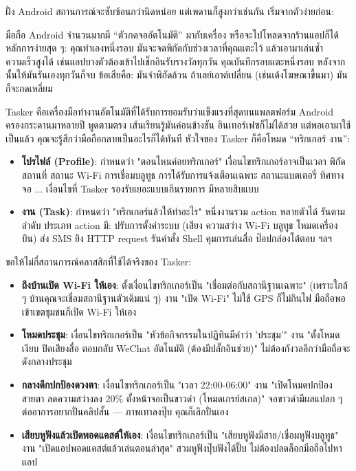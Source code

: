 
ฝั่ง Android สถานการณ์จะซับซ้อนกว่านิดหน่อย แต่เพดานก็สูงกว่าเช่นกัน เริ่มจากตัวง่ายก่อน:


มือถือ Android จำนวนมากมี “ตัวกดจออัตโนมัติ” มากับเครื่อง หรือจะไปโหลดจากร้านแอปก็ได้ หลักการง่ายสุด ๆ: คุณทำเองหนึ่งรอบ มันจะจดพิกัดกับช่วงเวลาที่คุณแตะไว้ แล้วเอามาเล่นซ้ำความเร็วสูงได้ เช่นแอปบางตัวต้องเข้าไปเช็กอินรับรางวัลทุกวัน คุณบันทึกรอบแตะหนึ่งรอบ หลังจากนั้นให้มันรันเองทุกวันก็จบ ข้อเสียคือ: มันจำพิกัดล้วน ถ้าเลย์เอาต์เปลี่ยน (เช่นเด้งโฆษณาขึ้นมา) มันก็จะกดเหลี่ยม


Tasker คือเครื่องมือทำงานอัตโนมัติที่ได้รับการยอมรับว่าแข็งแรงที่สุดบนแพลตฟอร์ม Android ครองกระดานมาหลายปี พูดตามตรง เส้นเรียนรู้มันค่อนข้างชัน อินเทอร์เฟซก็ไม่ได้สวย แต่พอเอามาใช้เป็นแล้ว คุณจะรู้สึกว่ามือถือกลายเป็นอะไรก็ได้ทันที หัวใจของ Tasker ก็คือโหมด “ทริกเกอร์ งาน”:

\begin{itemize}
  \item \textbf{โปรไฟล์ (Profile)}: กำหนดว่า "ตอนไหนค่อยทริกเกอร์" เงื่อนไขทริกเกอร์อาจเป็นเวลา พิกัดสถานที่ สถานะ Wi-Fi การเชื่อมบลูทูธ การได้รับการแจ้งเตือนเฉพาะ สถานะแบตเตอรี่ ทิศทางจอ ... เงื่อนไขที่ Tasker รองรับเยอะแบบเกินรายการ มีหลายสิบแบบ
  \item \textbf{งาน (Task)}: กำหนดว่า "ทริกเกอร์แล้วให้ทำอะไร" หนึ่งงานรวม action หลายตัวได้ รันตามลำดับ ประเภท action มี: ปรับการตั้งค่าระบบ (เสียง ความสว่าง Wi-Fi บลูทูธ โหมดเครื่องบิน) ส่ง SMS ยิง HTTP request รันคำสั่ง Shell คุมการเล่นสื่อ ป๊อปกล่องโต้ตอบ ฯลฯ
\end{itemize}

ขอให้ไม่กี่สถานการณ์คลาสสิกที่ใช้ได้จริงของ Tasker:

\begin{itemize}
  \item \textbf{ถึงบ้านเปิด Wi-Fi ให้เอง}: ตั้งเงื่อนไขทริกเกอร์เป็น "เชื่อมต่อกับสถานีฐานเฉพาะ" (เพราะใกล้ ๆ บ้านคุณจะเชื่อมสถานีฐานตัวเดิมแน่ ๆ) งาน "เปิด Wi-Fi" ไม่ใช้ GPS ก็ไม่กินไฟ มือถือพอเข้าเขตชุมชนก็เปิด Wi-Fi ให้เอง
  \item \textbf{โหมดประชุม}: เงื่อนไขทริกเกอร์เป็น "หัวข้อกิจกรรมในปฏิทินมีคำว่า 'ประชุม'" งาน "ตั้งโหมดเงียบ ปิดเสียงสื่อ ตอบกลับ WeChat อัตโนมัติ (ต้องมีปลั๊กอินช่วย)" ไม่ต้องกังวลอีกว่ามือถือจะดังกลางประชุม
  \item \textbf{กลางดึกปกป้องดวงตา}: เงื่อนไขทริกเกอร์เป็น "เวลา 22:00-06:00" งาน "เปิดโหมดปกป้องสายตา ลดความสว่างลง 20\% ตั้งหน้าจอเป็นขาวดำ (โหมดเกรย์สเกล)" จอขาวดำมีผลแปลก ๆ ต่ออาการอยากปั่นคลิปสั้น — ภาพเทาลงปุ๊บ คุณก็เลิกปั่นเอง
  \item \textbf{เสียบหูฟังแล้วเปิดพอดแคสต์ให้เอง}: เงื่อนไขทริกเกอร์เป็น "เสียบหูฟังมีสาย/เชื่อมหูฟังบลูทูธ" งาน "เปิดแอปพอดแคสต์แล้วเล่นตอนล่าสุด" สวมหูฟังปุ๊บฟังได้ปั๊บ ไม่ต้องปลดล็อกมือถือไปหาแอป
\end{itemize}


